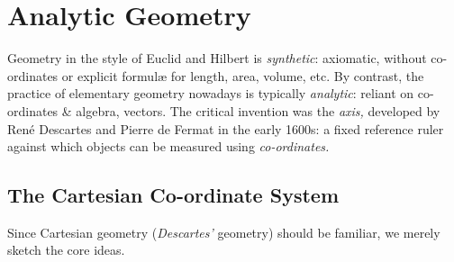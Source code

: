 \graphicspath{{3analytic/asy/}}

\section{Analytic Geometry}

Geometry in the style of Euclid and Hilbert is \emph{synthetic}: axiomatic, without co-ordinates or explicit formulæ for length, area, volume, etc. By contrast, the practice of elementary geometry nowadays is typically \emph{analytic}: reliant on co-ordinates \& algebra, vectors. The critical invention was the \emph{axis,} developed by René Descartes and Pierre de Fermat in the early 1600s: a fixed reference ruler against which objects can be measured using \emph{co-ordinates.}

\subsection{The Cartesian Co-ordinate System}

Since Cartesian geometry (\emph{Descartes'} geometry) should be familiar, we merely sketch the core ideas.

